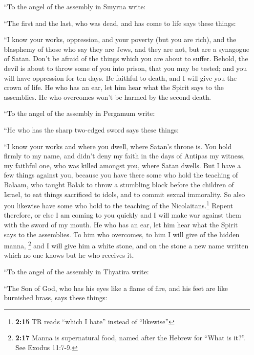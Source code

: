  ``To the angel of the assembly in Smyrna write:

``The first and the last, who was dead, and has come to life says these
things:

 ``I know your works, oppression, and your poverty (but
you are rich), and the blasphemy of those who say they are Jews, and
they are not, but are a synagogue of Satan.  Don't be
afraid of the things which you are about to suffer. Behold, the devil is
about to throw some of you into prison, that you may be tested; and you
will have oppression for ten days. Be faithful to death, and I will give
you the crown of life.  He who has an ear, let him hear
what the Spirit says to the assemblies. He who overcomes won't be harmed
by the second death.

 ``To the angel of the assembly in Pergamum write:

``He who has the sharp two-edged sword says these things:

 ``I know your works and where you dwell, where Satan's
throne is. You hold firmly to my name, and didn't deny my faith in the
days of Antipas my witness, my faithful one, who was killed amongst you,
where Satan dwells.  But I have a few things against you,
because you have there some who hold the teaching of Balaam, who taught
Balak to throw a stumbling block before the children of Israel, to eat
things sacrificed to idols, and to commit sexual immorality.
 So also you likewise have some who hold to the teaching
of the Nicolaitans.\footnote{\textbf{2:15} TR reads ``which I hate''
  instead of ``likewise''}  Repent therefore, or else I
am coming to you quickly and I will make war against them with the sword
of my mouth.  He who has an ear, let him hear what the
Spirit says to the assemblies. To him who overcomes, to him I will give
of the hidden manna, \footnote{\textbf{2:17} Manna is supernatural food,
  named after the Hebrew for ``What is it?''. See Exodus 11:7-9.} and I
will give him a white stone, and on the stone a new name written which
no one knows but he who receives it.

 ``To the angel of the assembly in Thyatira write:

``The Son of God, who has his eyes like a flame of fire, and his feet
are like burnished brass, says these things:

